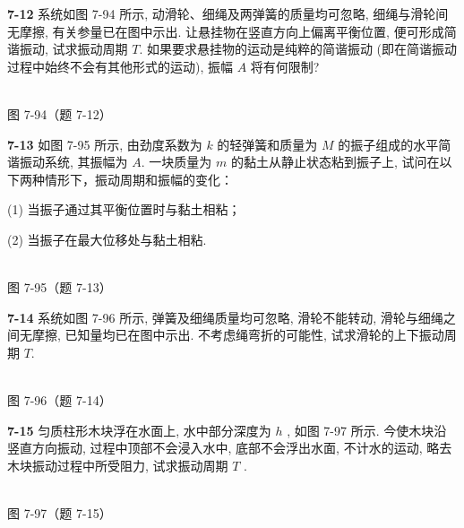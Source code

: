 \newpage

\textbf{7-12} 系统如图 7-94 所示, 动滑轮、细绳及两弹簧的质量均可忽略, 细绳与滑轮间无摩擦, 有关参量已在图中示出. 让悬挂物在竖直方向上偏离平衡位置, 便可形成简谐振动, 试求振动周期 $T$. 如果要求悬挂物的运动是纯粹的简谐振动 (即在简谐振动过程中始终不会有其他形式的运动), 振幅 $A$ 将有何限制?

\begin{center}
\resizebox{0.25\textwidth}{!}{}\\[4pt]
{\small 图 7-94（题 7-12）}
\end{center}

\newpage

\textbf{7-13} 如图 7-95 所示, 由劲度系数为 $k$ 的轻弹簧和质量为 $M$ 的振子组成的水平简谐振动系统, 其振幅为 $A$. 一块质量为 $m$ 的黏土从静止状态粘到振子上, 试问在以下两种情形下，振动周期和振幅的变化：

(1) 当振子通过其平衡位置时与黏土相粘；

(2) 当振子在最大位移处与黏土相粘.

\begin{center}
\resizebox{0.45\textwidth}{!}{}\\[4pt]
{\small 图 7-95（题 7-13）}
\end{center}

\newpage

\textbf{7-14} 系统如图 7-96 所示, 弹簧及细绳质量均可忽略, 滑轮不能转动, 滑轮与细绳之间无摩擦, 已知量均已在图中示出. 不考虑绳弯折的可能性, 试求滑轮的上下振动周期 $T$.

\begin{center}
\resizebox{0.28\textwidth}{!}{}\\[4pt]
{\small 图 7-96（题 7-14）}
\end{center}

\newpage

\textbf{7-15} 匀质柱形木块浮在水面上, 水中部分深度为 $h$ , 如图 7-97 所示. 今使木块沿竖直方向振动, 过程中顶部不会浸入水中, 底部不会浮出水面, 不计水的运动, 略去木块振动过程中所受阻力, 试求振动周期 $T$ .

\begin{center}
\resizebox{0.40\textwidth}{!}{}\\[4pt]
{\small 图 7-97（题 7-15）}
\end{center}

